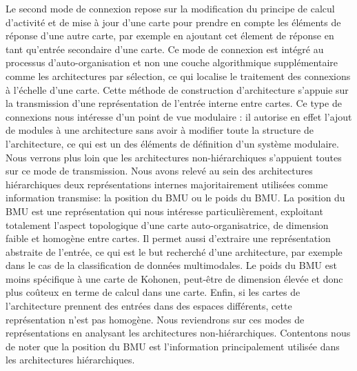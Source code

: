 \documentclass[../main]{subfiles}
\begin{document}
Le second mode de connexion repose sur la modification du principe de calcul d'activité et de mise à jour d'une carte pour prendre en compte les éléments de réponse d'une autre carte, par exemple en ajoutant cet élement de réponse en tant qu'entrée secondaire d'une carte.
Ce mode de connexion est intégré au processus d'auto-organisation et non une couche algorithmique supplémentaire comme les architectures par sélection, ce qui localise le traitement des connexions à l'échelle d'une carte. 
Cette méthode de construction d'architecture s'appuie sur la transmission d'une représentation de l'entrée interne entre cartes.
Ce type de connexions nous intéresse d'un point de vue modulaire : il autorise en effet l'ajout de modules à une architecture sans avoir à modifier toute la structure de l'architecture, ce qui est un des éléments de définition d'un système modulaire.
Nous verrons plus loin que les architectures non-hiérarchiques s'appuient toutes sur ce mode de transmission.
Nous avons relevé au sein des architectures hiérarchiques deux représentations internes majoritairement utilisées comme information transmise: la position du BMU ou le poids du BMU. La position du BMU est une représentation qui nous intéresse particulièrement, exploitant totalement l'aspect topologique d'une carte auto-organisatrice, de dimension faible et homogène entre cartes. Il permet aussi d'extraire une représentation abstraite de l'entrée, ce qui est le but recherché d'une architecture, par exemple dans le cas de la classification de données multimodales.
Le poids du BMU est moins spécifique à une carte de Kohonen, peut-être de dimension élevée et donc plus coûteux en terme de calcul dans une carte. Enfin, si les cartes de l'architecture prennent des entrées dans des espaces différents, cette représentation n'est pas homogène. Nous reviendrons sur ces modes de représentations en analysant les architectures non-hiérarchiques. Contentons nous de noter que la position du BMU est l'information principalement utilisée dans les architectures hiérarchiques.
\end{document}
